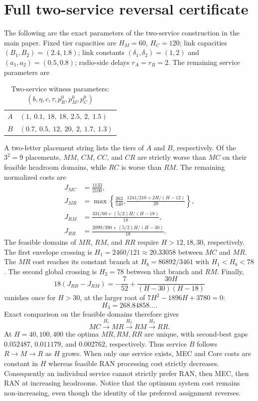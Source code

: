 \documentclass[10pt,a4paper]{article}
\begin{document}
\section{Full two-service reversal certificate}\label{sec:n2}
The following are the exact parameters of the two-service construction in the main paper. Fixed tier capacities are $H_M=60$, $H_C=120$; link capacities $(B_1,B_2)=(2.4,1.8)$; link constants $(\delta_1,\delta_2)=(1,2)$ and $(a_1,a_2)=(0.5,0.8)$; radio-side delays $r_A=r_B=2$. The remaining service parameters are
\begin{table}[h]\centering\small
\caption{Two-service witness parameters: $(b,\eta,c,\tau,p^0_R,p^0_M,p^0_C)$}
\begin{tabular}{ll}\toprule
$A$ & $(1,\ 0.1,\ 18,\ 18,\ 2.5,\ 2,\ 1.5)$\\
$B$ & $(0.7,\ 0.5,\ 12,\ 20,\ 2,\ 1.7,\ 1.3)$\\\bottomrule
\end{tabular}\end{table}
A two-letter placement string lists the tiers of $A$ and $B$, respectively. Of the $3^2=9$ placements, $MM$, $CM$, $CC$, and $CR$ are strictly worse than $MC$ on their feasible headroom domains, while $RC$ is worse than $RM$. The remaining normalized costs are
\begin{align}
J_{MC}&=\frac{1133}{2100},\nonumber\\
J_{MR}&=\max\left\{\frac{263}{540},\frac{1241/210+2H/(H-12)}{20}\right\},\nonumber\\
J_{RM}&=\frac{331/60+(5/2)H/(H-18)}{18},\label{eq:four}\\
J_{RR}&=\frac{2099/390+(5/2)H/(H-30)}{18}.\nonumber
\end{align}
The feasible domains of $MR$, $RM$, and $RR$ require $H>12,18,30$, respectively. The first envelope crossing is $H_1=2460/121\approx20.33058$ between $MC$ and $MR$. The $MR$ cost reaches its constant branch at $H_b=86892/3461$ with $H_1<H_b<78$. The second global crossing is $H_2=78$ between that branch and $RM$. Finally,
\begin{equation}
18(J_{RR}-J_{RM})=-\frac{7}{52}+\frac{30H}{(H-30)(H-18)}
\label{eq:diff}
\end{equation}
vanishes once for $H>30$, at the larger root of $7H^2-1896H+3780=0$:
\[H_3=268.84858\ldots.\]
Exact comparison on the feasible domains therefore gives
\[ MC\xrightarrow{H_1} MR\xrightarrow{H_2}RM\xrightarrow{H_3}RR.\]
At $H=40,100,400$ the optima $MR,RM,RR$ are unique, with second-best gaps $0.052487$, $0.011179$, and $0.002762$, respectively. Thus service $B$ follows $R\to M\to R$ as $H$ grows. When only one service exists, MEC and Core costs are constant in $H$ whereas feasible RAN processing cost strictly decreases. Consequently an individual service cannot strictly prefer RAN, then MEC, then RAN at increasing headrooms. Notice that the optimum system cost remains non-increasing, even though the identity of the preferred assignment reverses.
\end{document}
